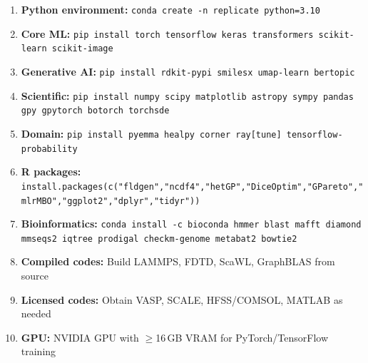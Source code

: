 \documentclass[11pt,letterpaper]{article}
\newcommand{\tool}[1]{\texttt{#1}}
\begin{document}
\begin{enumerate}[nosep]
\item \textbf{Python environment:} \tool{conda create -n replicate python=3.10}
\item \textbf{Core ML:} \tool{pip install torch tensorflow keras transformers scikit-learn scikit-image}
\item \textbf{Generative AI:} \tool{pip install rdkit-pypi smilesx umap-learn bertopic}
\item \textbf{Scientific:} \tool{pip install numpy scipy matplotlib astropy sympy pandas gpy gpytorch botorch torchsde}
\item \textbf{Domain:} \tool{pip install pyemma healpy corner ray[tune] tensorflow-probability}
\item \textbf{R packages:} \tool{install.packages(c("fldgen","ncdf4","hetGP","DiceOptim","GPareto","mlrMBO","ggplot2","dplyr","tidyr"))}
\item \textbf{Bioinformatics:} \tool{conda install -c bioconda hmmer blast mafft diamond mmseqs2 iqtree prodigal checkm-genome metabat2 bowtie2}
\item \textbf{Compiled codes:} Build LAMMPS, FDTD, ScaWL, GraphBLAS from source
\item \textbf{Licensed codes:} Obtain VASP, SCALE, HFSS/COMSOL, MATLAB as needed
\item \textbf{GPU:} NVIDIA GPU with $\geq$16\,GB VRAM for PyTorch/TensorFlow training
\end{enumerate}
\end{document}
